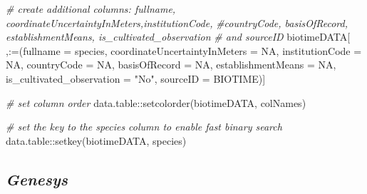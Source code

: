 \documentclass[
]{article}
\newenvironment{Shaded}{\begin{snugshade}}{\end{snugshade}}
\newcommand{\AttributeTok}[1]{\textcolor[rgb]{0.77,0.63,0.00}{#1}}
\newcommand{\CommentTok}[1]{\textcolor[rgb]{0.56,0.35,0.01}{\textit{#1}}}
\newcommand{\ConstantTok}[1]{\textcolor[rgb]{0.00,0.00,0.00}{#1}}
\newcommand{\FunctionTok}[1]{\textcolor[rgb]{0.00,0.00,0.00}{#1}}
\newcommand{\NormalTok}[1]{#1}
\newcommand{\SpecialCharTok}[1]{\textcolor[rgb]{0.00,0.00,0.00}{#1}}
\newcommand{\StringTok}[1]{\textcolor[rgb]{0.31,0.60,0.02}{#1}}
\begin{document}
\begin{Shaded}
\begin{Highlighting}[]
\CommentTok{\# create additional columns: \textquotesingle{}fullname\textquotesingle{}, \textquotesingle{}coordinateUncertaintyInMeters\textquotesingle{},\textquotesingle{}institutionCode\textquotesingle{},}
\CommentTok{\#\textquotesingle{}countryCode\textquotesingle{}, \textquotesingle{}basisOfRecord\textquotesingle{}, \textquotesingle{}establishmentMeans\textquotesingle{}, \textquotesingle{}is\_cultivated\_observation\textquotesingle{}}
\CommentTok{\# and \textquotesingle{}sourceID\textquotesingle{}}
\NormalTok{biotimeDATA[ ,}\StringTok{\textasciigrave{}}\AttributeTok{:=}\StringTok{\textasciigrave{}}\NormalTok{(}\AttributeTok{fullname =}\NormalTok{ species,}
                   \AttributeTok{coordinateUncertaintyInMeters =} \ConstantTok{NA}\NormalTok{,}
                   \AttributeTok{institutionCode =} \ConstantTok{NA}\NormalTok{,}
                   \AttributeTok{countryCode =} \ConstantTok{NA}\NormalTok{,}
                   \AttributeTok{basisOfRecord =} \ConstantTok{NA}\NormalTok{,}
                   \AttributeTok{establishmentMeans =} \ConstantTok{NA}\NormalTok{,}
                   \AttributeTok{is\_cultivated\_observation =} \StringTok{"No"}\NormalTok{,}
                   \AttributeTok{sourceID =} \StringTok{\textquotesingle{}BIOTIME\textquotesingle{}}\NormalTok{)]}

\CommentTok{\# set column order}
\NormalTok{data.table}\SpecialCharTok{::}\FunctionTok{setcolorder}\NormalTok{(biotimeDATA, colNames)}

\CommentTok{\# set the key to the species column to enable fast binary search}
\NormalTok{data.table}\SpecialCharTok{::}\FunctionTok{setkey}\NormalTok{(biotimeDATA, }\StringTok{\textquotesingle{}species\textquotesingle{}}\NormalTok{)}
\end{Highlighting}
\end{Shaded}

\hypertarget{genesys}{%
\subsection{\texorpdfstring{\emph{Genesys}}{Genesys}}\label{genesys}}
\end{document}
